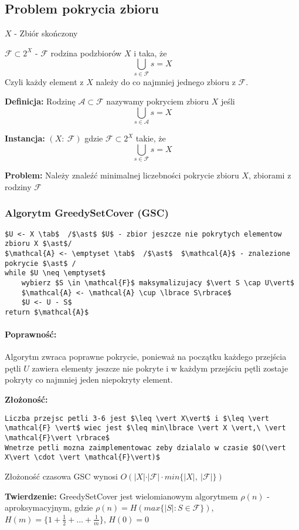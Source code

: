\subsection{Problem pokrycia zbioru}
$X$ - Zbiór skończony

$\mathcal{F} \subset 2^{X}$ - $\mathcal{F}$ rodzina podzbiorów $X$ i taka, że $$\bigcup_{s\in \mathcal{F}}s = X$$ 
Czyli każdy element z $X$ należy do co najmniej jednego zbioru z $\mathcal{F}$.

\textbf{Definicja: }Rodzinę $\mathcal{A}\subset \mathcal{F}$ nazywamy pokryciem zbioru $X$ jeśli $$\bigcup_{s\in \mathcal{A}}s = X$$

\textbf{Instancja: }$(X:\ \mathcal{F})$ gdzie $\mathcal{F} \subset 2^{X}$ takie, że $$\bigcup_{s\in \mathcal{F}}s = X$$

\textbf{Problem: }Należy znaleźć minimalnej liczebności pokrycie zbioru $X$, zbiorami z rodziny $\mathcal{F}$

\subsubsection{Algorytm GreedySetCover (GSC)}
\begin{lstlisting}[caption={GreedySetCover(X,F)}]
$U <- X \tab$  /$\ast$ $U$ - zbior jeszcze nie pokrytych elementow zbioru X $\ast$/
$\mathcal{A} <- \emptyset \tab$  /$\ast$  $\mathcal{A}$ - znalezione pokrycie $\ast$ /
while $U \neq \emptyset$
	wybierz $S \in \mathcal{F}$ maksymalizujacy $\vert S \cap U\vert$
	$\mathcal{A} <- \mathcal{A} \cup \lbrace S\rbrace$
	$U <- U - S$
return $\mathcal{A}$
\end{lstlisting}

\paragraph{Poprawność: }
Algorytm zwraca poprawne pokrycie, ponieważ na początku każdego przejścia pętli $U$ zawiera elementy jeszcze nie pokryte i w każdym przejściu pętli zostaje pokryty co najmniej jeden niepokryty element.

\textbf{Złożoność: }
\begin{lstlisting}
Liczba przejsc petli 3-6 jest $\leq \vert X\vert$ i $\leq \vert \mathcal{F} \vert$ wiec jest $\leq min\lbrace \vert X \vert,\ \vert \mathcal{F}\vert \rbrace$
Wnetrze petli mozna zaimplementowac zeby dzialalo w czasie $O(\vert X\vert \cdot \vert \mathcal{F}\vert)$
\end{lstlisting}
\begin{center}
Złożoność czasowa GSC wynosi $O(\vert X\vert \cdot \vert\mathcal{F}\vert \cdot min\lbrace \vert X \vert,\ \vert \mathcal{F}\vert \rbrace)$
\end{center}
\textbf{Twierdzenie: }GreedySetCover jest wielomianowym algorytmem $\rho(n)$ - aproksymacyjnym, gdzie $\rho(n) = H(max\lbrace\vert S\vert :S\in \mathcal{F}\rbrace)$, $H(m) = \lbrace 1 + \frac{1}{2} + ... +\frac{1}{m}\rbrace$, $H(0)=0$


